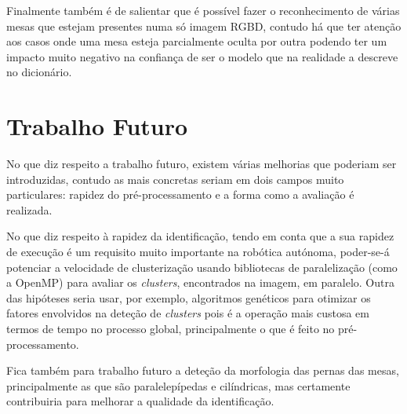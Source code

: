 Finalmente também é de salientar que é possível fazer o reconhecimento de várias mesas que estejam presentes numa só imagem RGBD, contudo há que ter atenção aos casos onde uma mesa esteja  parcialmente oculta por outra podendo ter um impacto muito negativo na confiança de ser o modelo que na realidade a descreve no dicionário.

\section{Trabalho Futuro}

No que diz respeito a trabalho futuro, existem várias melhorias que poderiam ser introduzidas, contudo as mais concretas seriam em dois campos muito particulares: rapidez do pré-processamento e a forma como a avaliação é realizada.

No que diz respeito à rapidez da identificação, tendo em conta que a sua rapidez de execução é um requisito muito importante na robótica autónoma, poder-se-á potenciar a velocidade de clusterização usando bibliotecas de paralelização (como a OpenMP) para avaliar os \emph{clusters}, encontrados na imagem, em paralelo. Outra das hipóteses seria usar, por exemplo, algoritmos genéticos para otimizar os fatores envolvidos na deteção de \emph{clusters} pois é a operação mais custosa em termos de tempo no processo global, principalmente o que é feito no pré-processamento.

Fica também para trabalho futuro a deteção da morfologia das pernas das mesas, principalmente as que são paralelepípedas e cilíndricas, mas certamente contribuiria para melhorar a qualidade da identificação.





